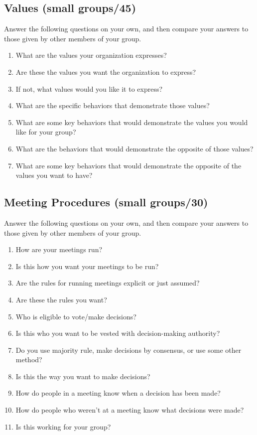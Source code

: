 \subsection*{Values (small groups/45)}

Answer the following questions on your own, and then compare your
answers to those given by other members of your group.

\begin{enumerate}
\item
  What are the values your organization expresses?
\item
  Are these the values you want the organization to express?
\item
  If not, what values would you like it to express?
\item
  What are the specific behaviors that demonstrate those values?
\item
  What are some key behaviors that would demonstrate the values you
  would like for your group?
\item
  What are the behaviors that would demonstrate the opposite of those
  values?
\item
  What are some key behaviors that would demonstrate the opposite of
  the values you want to have?
\end{enumerate}

\subsection*{Meeting Procedures (small groups/30)}

Answer the following questions on your own, and then compare your
answers to those given by other members of your group.

\begin{enumerate}
\item
  How are your meetings run?
\item
  Is this how you want your meetings to be run?
\item
  Are the rules for running meetings explicit or just assumed?
\item
  Are these the rules you want?
\item
  Who is eligible to vote/make decisions?
\item
  Is this who you want to be vested with decision-making authority?
\item
  Do you use majority rule, make decisions by consensus, or use some
  other method?
\item
  Is this the way you want to make decisions?
\item
  How do people in a meeting know when a decision has been made?
\item
  How do people who weren't at a meeting know what decisions were
  made?
\item
  Is this working for your group?
\end{enumerate}

